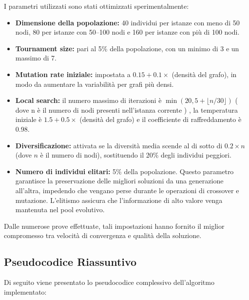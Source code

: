 \documentclass[12pt,a4paper,twoside]{article}
\begin{document}
I parametri utilizzati sono stati ottimizzati sperimentalmente:
\begin{itemize}
    \item\textbf{Dimensione della popolazione:} 40 individui per istanze con meno di 50 nodi, 80 per istanze con 50--100 nodi e 160 per istanze con più di 100 nodi.
    \item \textbf{Tournament size:} pari al 5\% della popolazione, con un minimo di 3 e un massimo di 7.
    \item \textbf{Mutation rate iniziale:} impostata a \(0.15 + 0.1 \times\) (densità del grafo), in modo da aumentare la variabilità per grafi più densi.
    \item \textbf{Local search:} il numero massimo di iterazioni è \(\min(20, 5 + \lfloor n/30 \rfloor)\) ( dove n è il numero di nodi presenti nell'istanza corrente ) , la temperatura iniziale è \(1.5 + 0.5 \times\) (densità del grafo) e il coefficiente di raffreddamento è 0.98.
    \item \textbf{Diversificazione:} attivata se la diversità media scende al di sotto di \(0.2 \times n\) (dove \(n\) è il numero di nodi), sostituendo il 20\% degli individui peggiori.
     \item \textbf{Numero di individui elitari:} 5\% della popolazione.  
    Questo parametro garantisce la preservazione delle migliori soluzioni da una generazione all'altra, impedendo che vengano perse durante le operazioni di crossover e mutazione. L'elitismo assicura che l'informazione di alto valore venga mantenuta nel pool evolutivo.
\end{itemize}
Dalle numerose prove effettuate, tali impostazioni hanno fornito il miglior compromesso tra velocità di convergenza e qualità della soluzione.

\subsection*{Pseudocodice Riassuntivo}

Di seguito viene presentato lo pseudocodice complessivo dell'algoritmo implementato:
\end{document}
